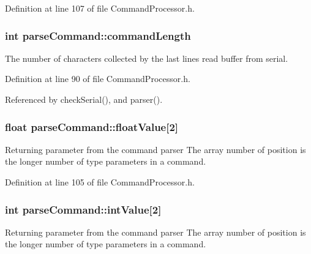 Definition at line 107 of file Command\-Processor.\-h.

\hypertarget{structparse_command_a8359e121af4d2f16e054ead0b7844a30}{
\subsubsection[{command\-Length}]{\setlength{\rightskip}{0pt plus 5cm}int parse\-Command\-::command\-Length}}\label{structparse_command_a8359e121af4d2f16e054ead0b7844a30}


The number of characters collected by the last lines read buffer from serial. 



Definition at line 90 of file Command\-Processor.\-h.



Referenced by check\-Serial(), and parser().

\hypertarget{structparse_command_a475f06e9e3728cc583008ad66dc48329}{
\subsubsection[{float\-Value}]{\setlength{\rightskip}{0pt plus 5cm}float parse\-Command\-::float\-Value\mbox{[}2\mbox{]}}}\label{structparse_command_a475f06e9e3728cc583008ad66dc48329}


Returning parameter from the command parser The array number of position is the longer number of type parameters in a command. 



Definition at line 105 of file Command\-Processor.\-h.

\hypertarget{structparse_command_a9ad775810b79683631510fd333096c6f}{
\subsubsection[{int\-Value}]{\setlength{\rightskip}{0pt plus 5cm}int parse\-Command\-::int\-Value\mbox{[}2\mbox{]}}}\label{structparse_command_a9ad775810b79683631510fd333096c6f}


Returning parameter from the command parser The array number of position is the longer number of type parameters in a command. 



